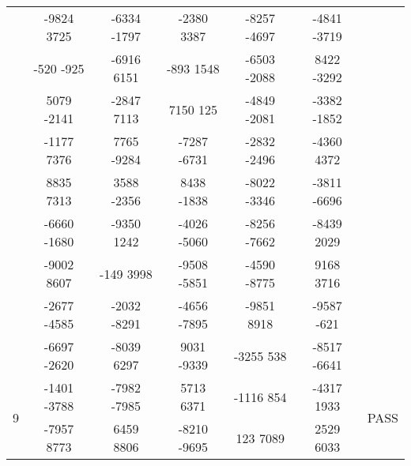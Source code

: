 \begin{landscape}
\begin{table}[]
\begin{tabular}{|c|ccccc|c|}
        & -9824 3725 & -6334 -1797 & -2380 3387 & -8257 -4697 & -4841 -3719 & 		 \\
        & -520 -925 & -6916 6151 & -893 1548 & -6503 -2088 & 8422 -3292 & 		 \\
        & 5079 -2141 & -2847 7113 & 7150 125 & -4849 -2081 & -3382 -1852 & 		 \\
        & -1177 7376 & 7765 -9284 & -7287 -6731 & -2832 -2496 & -4360 4372 & 		 \\
        & 8835 7313 & 3588 -2356 & 8438 -1838 & -8022 -3346 & -3811 -6696 & 		 \\
        & -6660 -1680 & -9350 1242 & -4026 -5060 & -8256 -7662 & -8439 2029 & 		 \\
        & -9002 8607 & -149 3998 & -9508 -5851 & -4590 -8775 & 9168 3716 & 		 \\
        & -2677 -4585 & -2032 -8291 & -4656 -7895 & -9851 8918 & -9587 -621 & 		 \\
        & -6697 -2620 & -8039 6297 & 9031 -9339 & -3255 538 & -8517 -6641 & 		 \\
		\multirow{2}{*}{9} & -1401 -3788 & -7982 -7985 & 5713 6371 & -1116 854 & -4317 1933 & \multirow{2}{*}{PASS} \\
		& -7957 8773 & 6459 8806 & -8210 -9695 & 123 7089 & 2529 6033 & 		 \\ \hline
        \end{tabular}
    \end{table}
\end{landscape}
